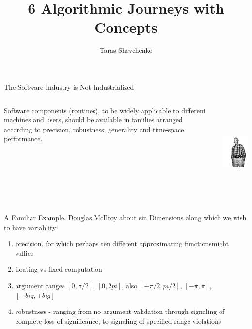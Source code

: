 \documentclass[10pt]{beamer}
\title{6 Algorithmic Journeys with Concepts}
\date{}
\author{Taras Shevchenko}
\institute{Rails Reactor / Giphy}
\begin{document}
\maketitle



\begin{frame}{The Software Industry is Not Industrialized}
    \begin{columns}
        \begin{column}{0.6\textwidth}
			Software components (routines), to be widely applicable to
			different machines and users, should be available in families arranged
			according to precision, robustness, generality and time-space performance.
        \end{column}
        \begin{column}{0.4\textwidth}  %
                \begin{center}
					\includegraphics[height=5cm]{images/doug_mcilroy.jpg}
                \end{center}
        \end{column}
    \end{columns}
\end{frame}

\begin{frame}{A Familiar Example. Douglas McIlroy about sin}
Dimensions along which we wish to have variablity:
\begin{enumerate}
    \item precision, for which perhaps ten different approximating functionsmight suffice
    \item floating vs fixed computation
    \item argument ranges $[0, \pi/2]$, $[0, 2pi]$, also $[-\pi/2, pi/2]$, $[-\pi, \pi]$, $[-big, +big]$
    \item robustness - ranging from no argument validation through signaling of complete loss of significance, to signaling of specified range violations
\end{enumerate}

\end{frame}
\end{document}
